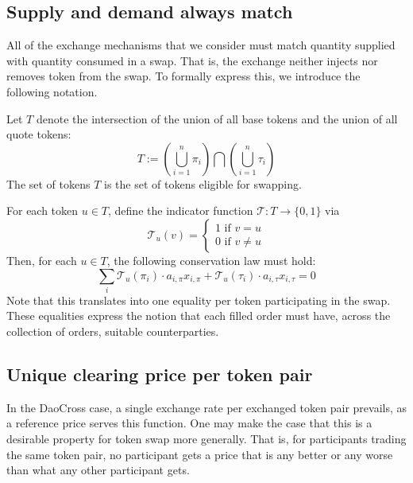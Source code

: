 \documentclass[11pt, reqno]{amsart}
\theoremstyle{definition}
\theoremstyle{remark}
\begin{document}


\subsection{Supply and demand always match}
All of the exchange mechanisms that we consider must match quantity supplied
with quantity consumed in a swap. That is, the exchange neither injects nor
removes token from the swap. To formally express this, we introduce the
following notation.

Let $T$ denote the intersection of the union of all base tokens and the union
of all quote tokens:
\[
	T :=
    \left( \bigcup_{i=1}^n \pi_i \right)
	\bigcap
    \left( \bigcup_{i=1}^n \tau_i \right)
\]
The set of tokens $T$ is the set of tokens eligible for swapping.

For each token $u \in T$, define the indicator function
$\mathcal{T}: T \to \{0, 1\}$ via
\[
	\mathcal{T}_u(v) =
	\begin{cases}
		1 \text{ if } v = u \\
		0 \text{ if } v \neq u
	\end{cases}
\]
Then, for each $u \in T$, the following conservation law must hold:
\begin{equation}\label{token_conservation_law}
    \sum_i \mathcal{T}_u(\pi_i) \cdot a_{i, \pi} x_{i, \pi}
    + \mathcal{T}_u(\tau_i) \cdot a_{i, \tau} x_{i, \tau}
    = 0
\end{equation}
Note that this translates into one equality per token participating in the
swap. These equalities express the notion that each filled order must have,
across the collection of orders, suitable counterparties.


\subsection{Unique clearing price per token pair}

In the DaoCross case, a single exchange rate per exchanged token pair
prevails, as a reference price serves this function.
One may make the case that this is a desirable property for token swap more
generally. That is, for participants trading the same token pair, no
participant gets a price that is any better or any worse than what any other
participant gets.
\end{document}
